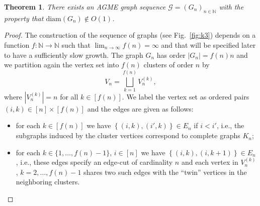 \documentclass[a4paper,onecolumn,accepted=2024-12-14]{quantumarticle}
\newtheorem{theorem}{Theorem}[section]%
\theoremstyle{plain}
\newcommand{\cG}{{\mathcal G}}         %
\newcommand{\N}{\mathbb{N}} %
\begin{document}
\begin{theorem}\label{teo:diam}
There exists an AGME graph sequence $\cG=(G_n)_{n\in\N}$ with the property that $\mathrm{diam}(G_n)\notin O(1)$.
\end{theorem}
\begin{proof}
The construction of the sequence of graphs (see Fig.~\ref{fig:k3}) depends on a function $f\colon\mathbb{N}\to\mathbb{N}$ such that $\lim_{n\to\infty}f(n)=\infty$ and that will be specified  later to have a sufficiently slow growth. The graph $G_n$ has order
$|G_n|=f(n)n$ and we partition again the vertex set into $f(n)$ clusters of order $n$ by
\begin{equation}
V_n=\bigsqcup_{k=1}^{f(n)}V_n^{(k)},
\end{equation}
where $|V_n^{(k)}|=n$ for all $k\in [f(n)]$. We label the vertex set as
ordered pairs $( i,k)\in [n]\times [f(n)]$ and the edges are given as follows:
\begin{itemize}
 \item[(i)] for each $k\in [f(n)]$ we have
 $\left\{( i,k), (i',k)\right\}\in E_n$ if $i<i'$, i.e.,
 the subgraphs induced by the cluster vertices correspond to complete graphs $K_n$;
 \item[(ii)] for each $k\in \{1,\dots, f(n)-1\}$, $i\in [n]$ we have
 $\left\{( i,k), ( i,k+1)\right\}\in E_n$, i.e., these edges specify an edge-cut of cardinality $n$ and each vertex in $V_n^{(k)}$,
 $k=2,\dots,f(n)-1$ shares two such edges with the ``twin'' vertices in the neighboring clusters.
\end{itemize}


\begin{figure}[h]
\centering
{}
\end{figure}
\end{proof}
\end{document}
